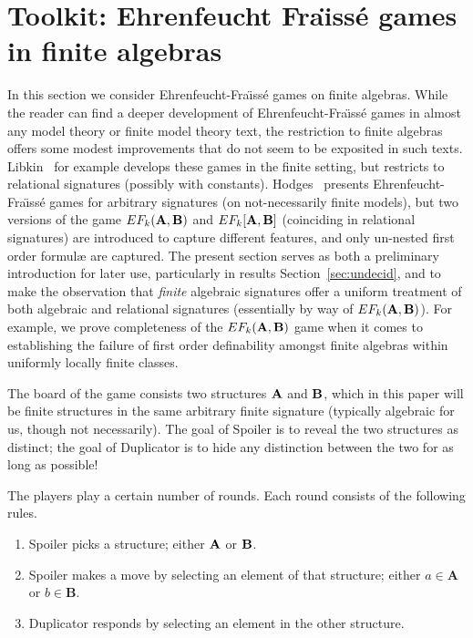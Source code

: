 \documentclass[reqno]{amsart}
\theoremstyle{plain}
\theoremstyle{definition}
\newcommand{\A}{\mathbf A}
\newcommand{\B}{\mathbf B}
\begin{document}
\section{Toolkit: Ehrenfeucht Fra\"{\i}ss\'e games in finite algebras}\label{sec:EF}
In this section we consider  Ehrenfeucht-Fra\"{\i}ss\'e games on finite algebras.  
While the reader can find a deeper development of Ehrenfeucht-Fra\"{\i}ss\'e games in almost any model theory or finite model theory text, the restriction to finite algebras offers some modest improvements that do not seem to be exposited in such texts.   
Libkin~\cite{lib} for example develops these games in the finite setting, but restricts to relational signatures (possibly with constants).  
Hodges~\cite{hod} presents Ehrenfeucht-Fra\"{\i}ss\'e games for arbitrary signatures (on not-necessarily finite models), but two versions of the game $EF_k({\bf A},{\bf B})$ and $EF_k[{\bf A},{\bf B}]$ (coinciding in relational signatures) are introduced to capture different features, and only un-nested first order formul{\ae} are captured.  
The present section serves as both a preliminary introduction for later use, particularly in results Section~\ref{sec:undecid}, and to make the observation that \emph{finite} algebraic signatures offer a uniform treatment of both algebraic and relational signatures (essentially by way of $EF_k({\bf A},{\bf B})$).  For example, we prove completeness of the $EF_k({\bf A},{\bf B})$ game when it comes to establishing the failure of first order definability amongst finite algebras within uniformly locally finite classes.  

The board of the game consists two structures ${\bf A}$ and ${\bf B}$, which in this paper will be finite structures in the same arbitrary finite signature (typically algebraic for us, though not necessarily).  The goal of Spoiler is to reveal the two structures as distinct; the goal of Duplicator is to hide any distinction between the two  for as long as possible!

The players play a certain number of rounds.  Each round consists of the following rules.
\begin{enumerate}
\item Spoiler picks a structure; either ${\bf A}$ or ${\bf B}$.
\item Spoiler makes a move by selecting an element of that structure; either $a\in{\A}$ or $b\in{\B}$.
\item Duplicator responds by selecting an element in the other structure.\\
\end{enumerate}
\end{document}
